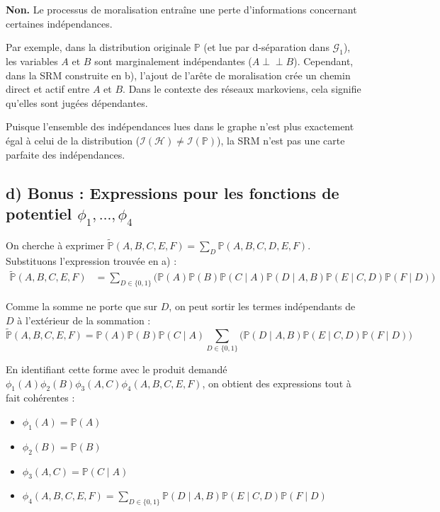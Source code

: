 \documentclass{article}
\newcommand{\indep}{\perp \!\!\! \perp}
\begin{document}
\textbf{Non.} Le processus de moralisation entraîne une perte d'informations concernant certaines indépendances. 

Par exemple, dans la distribution originale $\mathbb{P}$ (et lue par d-séparation dans $\mathcal{G}_1$), les variables $A$ et $B$ sont marginalement indépendantes ($A \indep B$). Cependant, dans la SRM construite en b), l'ajout de l'arête de moralisation crée un chemin direct et actif entre $A$ et $B$. Dans le contexte des réseaux markoviens, cela signifie qu'elles sont jugées dépendantes. 

Puisque l'ensemble des indépendances lues dans le graphe n'est plus exactement égal à celui de la distribution ($\mathcal{I}(\mathcal{H}) \neq \mathcal{I}(\mathbb{P})$), la SRM n'est pas une carte parfaite des indépendances.

\subsection*{d) Bonus : Expressions pour les fonctions de potentiel $\phi_1, \dots, \phi_4$}

On cherche à exprimer $\tilde{\mathbb{P}}(A, B, C, E, F) = \sum_{D} \mathbb{P}(A, B, C, D, E, F)$. 
Substituons l'expression trouvée en a) :
\begin{align*}
\tilde{\mathbb{P}}(A, B, C, E, F) &= \sum_{D \in \{0,1\}} \Big( \mathbb{P}(A)\mathbb{P}(B)\mathbb{P}(C \mid A)\mathbb{P}(D \mid A, B)\mathbb{P}(E \mid C, D)\mathbb{P}(F \mid D) \Big)
\end{align*}

Comme la somme ne porte que sur $D$, on peut sortir les termes indépendants de $D$ à l'extérieur de la sommation :
\[ \tilde{\mathbb{P}}(A, B, C, E, F) = \mathbb{P}(A)\mathbb{P}(B)\mathbb{P}(C \mid A) \sum_{D \in \{0,1\}} \Big( \mathbb{P}(D \mid A, B)\mathbb{P}(E \mid C, D)\mathbb{P}(F \mid D) \Big) \]

En identifiant cette forme avec le produit demandé $\phi_1(A)\phi_2(B)\phi_3(A, C)\phi_4(A, B, C, E, F)$, on obtient des expressions tout à fait cohérentes :
\begin{itemize}
    \item $\phi_1(A) = \mathbb{P}(A)$
    \item $\phi_2(B) = \mathbb{P}(B)$
    \item $\phi_3(A, C) = \mathbb{P}(C \mid A)$
    \item $\phi_4(A, B, C, E, F) = \displaystyle \sum_{D \in \{0,1\}} \mathbb{P}(D \mid A, B)\mathbb{P}(E \mid C, D)\mathbb{P}(F \mid D)$
\end{itemize}
\
\end{document}
